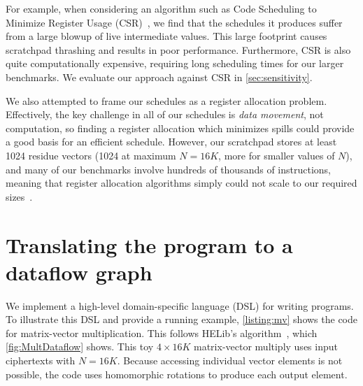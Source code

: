 For example, when considering an algorithm such as Code Scheduling to Minimize Register Usage (CSR)~\cite{goodman:ics1988:code}, we find that the schedules it produces suffer from a large blowup of live intermediate values. This large footprint causes scratchpad thrashing and results in poor performance. Furthermore, CSR is also quite computationally expensive, requiring long scheduling times for our larger benchmarks. We evaluate our approach against CSR in \autoref{sec:sensitivity}.

We also attempted to frame our schedules as a register allocation problem. Effectively, the key challenge in all of our schedules is \emph{data movement}, not computation, so finding a register allocation which minimizes spills could provide a good basis for an efficient schedule. However, our scratchpad stores at least 1024 residue vectors (1024 at maximum $N = 16K$, more for smaller values of $N$), and many of our benchmarks involve hundreds of thousands of instructions, meaning that register allocation algorithms simply could not scale to our required sizes~\cite{barany:odes2011:register, xu:sigplan2007:tetris, touati:ijpp2005:register, berson:pact1993:ursa}.

\section{Translating the program to a dataflow graph}
\label{sec:programming}

We implement a high-level domain-specific language (DSL) for writing \name programs.
%
To illustrate this DSL and provide a running example,
\autoref{listing:mv} shows the code for matrix-vector multiplication.
This follows HELib's algorithm~\cite{halevi:crypto14:algorithms}, which \autoref{fig:MultDataflow} shows.
This toy $4 \times 16K$ matrix-vector multiply uses input ciphertexts with $N=16K$.
Because accessing individual vector elements is not possible, the code uses homomorphic rotations %
to produce each output element.


\figMultDataflow

